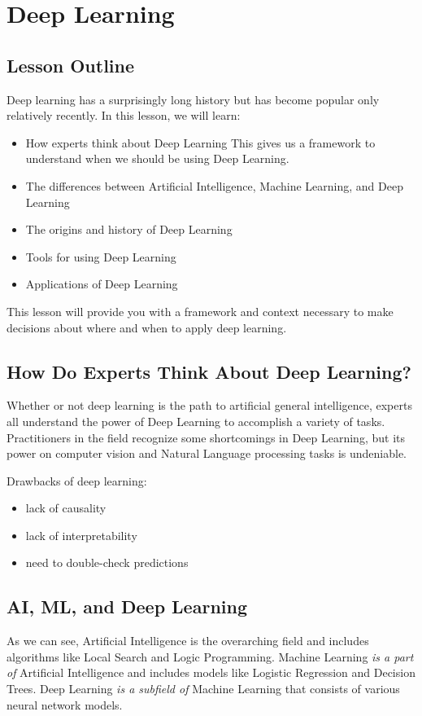 \chapter{Deep Learning}

\section{Lesson Outline}
Deep learning has a surprisingly long history but has become popular only relatively recently. In this lesson, we will learn:

\begin{itemize}
    \item How experts think about Deep Learning
This gives us a framework to understand when we should be using Deep Learning.

    \item The differences between Artificial Intelligence, Machine Learning, and Deep Learning
    \item The origins and history of Deep Learning
    \item Tools for using Deep Learning
    \item Applications of Deep Learning
\end{itemize}
This lesson will provide you with a framework and context necessary to make decisions about where and when to apply deep learning.

\section{How Do Experts Think About Deep Learning?}
Whether or not deep learning is the path to artificial general intelligence, experts all understand the power of Deep Learning to accomplish a variety of tasks. Practitioners in the field recognize some shortcomings in Deep Learning, but its power on computer vision and Natural Language processing tasks is undeniable.

Drawbacks of deep learning:
\begin{itemize}
    \item lack of causality
    \item lack of interpretability 
    \item need to double-check predictions 
\end{itemize}

\section{AI, ML, and Deep Learning}
As we can see, Artificial Intelligence is the overarching field and includes algorithms like Local Search and Logic Programming. Machine Learning \textit{is a part of} Artificial Intelligence and includes models like Logistic Regression and Decision Trees. Deep Learning \textit{is a subfield of} Machine Learning that consists of various neural network models.

